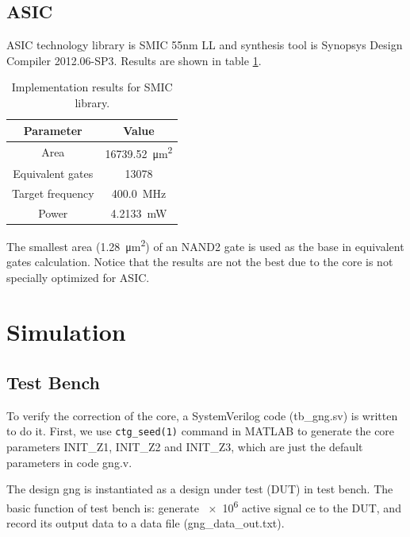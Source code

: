 \documentclass[a4paper, titlepage]{article}
\begin{document}
\subsection{ASIC}
ASIC technology library is SMIC 55nm LL and
synthesis tool is Synopsys Design Compiler 2012.06-SP3.
Results are shown in table \ref{tbl:impsmic}.
\begin{table}[!htbp]
\centering
\caption{Implementation results for SMIC library.}
\label{tbl:impsmic}
\begin{tabular}{cc}
    \addlinespace
    \toprule

    \textbf{Parameter} & \textbf{Value} \\

    \midrule

    Area & \SI{16739.52}{\square\micro\meter} \\
    Equivalent gates & \num{13078} \\
    Target frequency & \SI{400.0}{\mega\hertz} \\
    Power & \SI{4.2133}{\milli\watt} \\

    \bottomrule
\end{tabular}
\end{table}

The smallest area (\SI{1.28}{\square\micro\meter}) of an NAND2 gate is used as
the base in equivalent gates calculation.
Notice that the results are not the best due to
the core is not specially optimized for ASIC.


\section{Simulation}

\subsection{Test Bench}
To verify the correction of the core, a SystemVerilog code
(\textsf{tb\_gng.sv}) is written to do it.
First, we use \texttt{ctg\_seed(1)} command in MATLAB to generate
the core parameters \textsf{INIT\_Z1}, \textsf{INIT\_Z2} and
\textsf{INIT\_Z3}, which are just the default parameters in code \textsf{gng.v}.

The design gng is instantiated as a design under test (DUT) in test bench.
The basic function of test bench is:
generate \num{e6} active signal \textsf{ce} to the DUT,
and record its output data to a data file (\textsf{gng\_data\_out.txt}).
\end{document}
